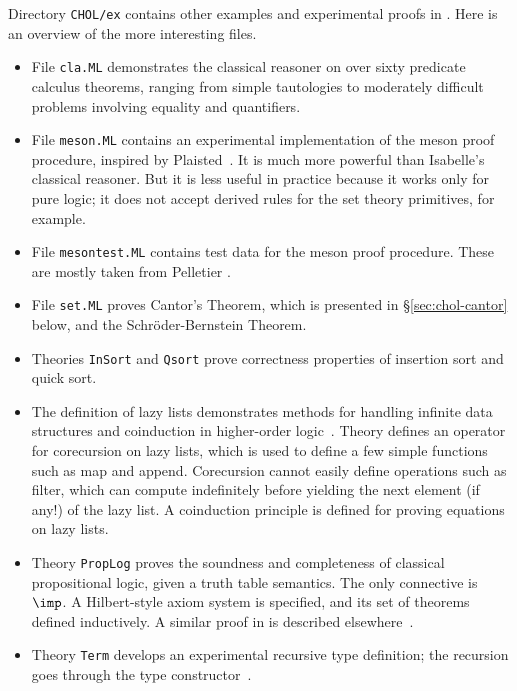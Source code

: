 Directory {\tt CHOL/ex} contains other examples and experimental proofs in
{\CHOL}.  Here is an overview of the more interesting files.
\begin{itemize}
\item File {\tt cla.ML} demonstrates the classical reasoner on over sixty
  predicate calculus theorems, ranging from simple tautologies to
  moderately difficult problems involving equality and quantifiers.

\item File {\tt meson.ML} contains an experimental implementation of the {\sc
    meson} proof procedure, inspired by Plaisted~\cite{plaisted90}.  It is
  much more powerful than Isabelle's classical reasoner.  But it is less
  useful in practice because it works only for pure logic; it does not
  accept derived rules for the set theory primitives, for example.

\item File {\tt mesontest.ML} contains test data for the {\sc meson} proof
  procedure.  These are mostly taken from Pelletier \cite{pelletier86}.

\item File {\tt set.ML} proves Cantor's Theorem, which is presented in
  \S\ref{sec:chol-cantor} below, and the Schr\"oder-Bernstein Theorem.

\item Theories {\tt InSort} and {\tt Qsort} prove correctness properties of
  insertion sort and quick sort.

\item The definition of lazy lists demonstrates methods for handling
  infinite data structures and coinduction in higher-order
  logic~\cite{paulson-coind}.  Theory  defines an operator for
  corecursion on lazy lists, which is used to define a few simple functions
  such as map and append.  Corecursion cannot easily define operations such
  as filter, which can compute indefinitely before yielding the next
  element (if any!) of the lazy list.  A coinduction principle is defined
  for proving equations on lazy lists.

\item Theory {\tt PropLog} proves the soundness and completeness of
  classical propositional logic, given a truth table semantics.  The only
  connective is $\imp$.  A Hilbert-style axiom system is specified, and its
  set of theorems defined inductively.  A similar proof in \ZF{} is
  described elsewhere~\cite{paulson-set-II}.

\item Theory {\tt Term} develops an experimental recursive type definition;
  the recursion goes through the type constructor~.


\end{itemize}
